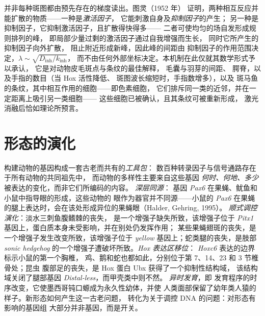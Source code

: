 \begin{proposition}\label{prop:b3:developmental-genetics:turing}
并非每种斑图都由预先存在的梯度读出。图灵（1952 年）
证明，两种相互反应并能扩散的物质——一种是\emph{激活因子}，
它能刺激自身及\emph{抑制因子}的产生；
另一种是抑制因子，它抑制激活因子，且扩散得快得多——
二者可使均匀的场自发形成规则排列的峰，
即局部少量过剩的激活因子通过自我增强而生长，
同时它所产生的抑制因子向外扩散，
阻止附近形成新峰，因此峰的间距由
抑制因子的作用范围决定，$\lambda \sim \sqrt{D_{\mathrm{inh}}/k_{\mathrm{inh}}}$，
而不由任何外部坐标决定。本机制在此仅就其数学形式予以承认，
它是对动物皮毛斑点与条纹的最佳解释，
毛囊与羽芽的间距、
腭脊，以及手指的数目（当 Hox 活性降低、
斑图波长缩短时，手指数增多），以及
斑马鱼的条纹，其中相互作用的细胞——即色素细胞，
它们排斥同一类的近邻，并在一定距离上吸引另一类细胞——
这些细胞已被确认，且其条纹可被重新形成，
激光消融后恰如理论所预言。
\end{proposition}
\admitted

\section{形态的演化}

\begin{definition}[演化发育生物学]\label{def:b3:developmental-genetics:evodevo}
构建动物的基因构成一套古老而共有的\emph{工具包}：
数百种转录因子与信号通路存在于所有动物的共同祖先中，
而动物的多样性主要来自这些基因
\emph{何时、何地、多少}被表达的变化，而非它们所编码的内容。
\emph{深层同源}：
基因 \emph{Pax6} 在果蝇、鱿鱼和小鼠中指导眼的形成，这些动物的
眼作为器官并不同源——小鼠的 \emph{Pax6} 在果蝇
的腿上表达时，会在该处形成异位的果蝇眼（Halder, Gehring, 1995）。
\emph{顺式调控演化}：淡水三刺鱼腹鳍棘的丧失，
是一个增强子缺失所致，该增强子位于
\emph{Pitx1} 基因上，蛋白质本身未受影响，并在别处仍发挥作用；
某些果蝇翅斑的丧失，是一个增强子发生改变所致，该增强子位于
\emph{yellow} 基因上；蛇类腿的丧失，是肢部
\emph{sonic hedgehog} 的一个增强子遭破坏所致。\emph{Hox 表达区移位}：
\emph{Hoxc6} 表达的边界标示小鼠的第一个胸椎，
鸡、鹅和蛇也都如此，分别位于第 7、14、23 和 3 节椎骨处；昆虫
腹部足的丧失，是 Hox 蛋白 Ubx 获得了一个抑制性结构域，
该结构域关闭了腿部基因 \emph{Distal-less}，而甲壳类中则不然。
\emph{异时发育}，即
发育程序的时序改变，它使墨西哥钝口螈成为永久性幼体，并使
人类面部保留了幼年类人猿的样子。新形态如何产生这一古老问题，
转化为关于调控 DNA 的问题：对形态有影响的基因组
大部分并非基因，而是开关。
\end{definition}

